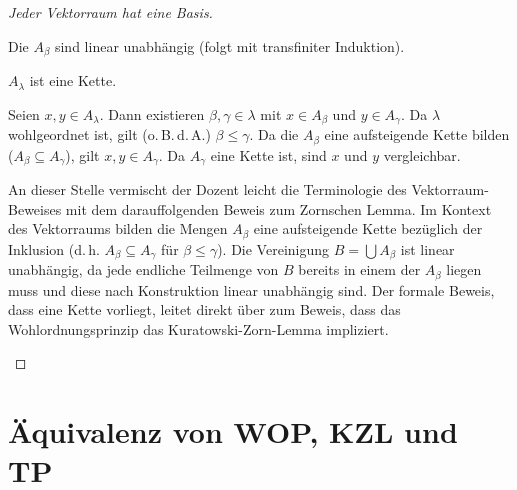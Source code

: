 \begin{proof}[Jeder Vektorraum hat eine Basis]
\begin{math-stroke}
\begin{remark}
Die $A_\beta$ sind linear unabhängig (folgt mit transfiniter Induktion).
\end{remark}

\begin{claim}
$A_\lambda$ ist eine Kette.
\end{claim}
\begin{short-proof}
Seien $x, y \in A_\lambda$.
Dann existieren $\beta, \gamma \in \lambda$ mit $x \in A_\beta$ und $y \in A_\gamma$.
Da $\lambda$ wohlgeordnet ist, gilt (o.\,B.\,d.\,A.) $\beta \le \gamma$.
Da die $A_\beta$ eine aufsteigende Kette bilden ($A_\beta \subseteq A_\gamma$), gilt $x, y \in A_\gamma$.
Da $A_\gamma$ eine Kette ist, sind $x$ und $y$ vergleichbar.
\end{short-proof}
\end{math-stroke}

\begin{didactic-insight}
An dieser Stelle vermischt der Dozent leicht die Terminologie des Vektorraum-Beweises mit dem darauffolgenden Beweis zum Zornschen Lemma. Im Kontext des Vektorraums bilden die Mengen $A_\beta$ eine aufsteigende Kette bezüglich der Inklusion (d.\,h. $A_\beta \subseteq A_\gamma$ für $\beta \le \gamma$). Die Vereinigung $B = \bigcup A_\beta$ ist linear unabhängig, da jede endliche Teilmenge von $B$ bereits in einem der $A_\beta$ liegen muss und diese nach Konstruktion linear unabhängig sind. Der formale Beweis, dass eine Kette vorliegt, leitet direkt über zum Beweis, dass das Wohlordnungsprinzip das Kuratowski-Zorn-Lemma impliziert.
\end{didactic-insight}
\end{proof}

\section{Äquivalenz von WOP, KZL und TP}

\begin{math-stroke}
\end{math-stroke}

